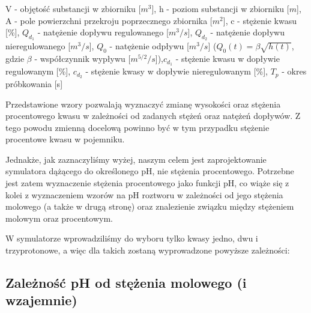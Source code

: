 \documentclass[polish,polish,a4paper,12pt]{article}
\begin{document}
	{\small V - objętość substancji w zbiorniku [$m^3$], \hspace{1em}h - poziom substancji w zbiorniku [$m$], \hspace{1em}A - pole powierzchni przekroju poprzecznego zbiornika [$m^2$], \hspace{1em}c - stężenie kwasu [\%], \hspace{1em}$Q_{d_{1}}$ - natężenie dopływu regulowanego [$m^3/s$], \hspace{1em}$Q_{d_{2}}$ - natężenie dopływu nieregulowanego [$m^3/s$], \hspace{1em} $Q_0$ - natężenie odpływu [$m^3/s$] ($Q_0(t) = \beta \sqrt{h(t)}$, gdzie $\beta$ - współczynnik wypływu [$m^{5/2}/s$]),\hspace{1em}$c_{d_{1}}$ - stężenie kwasu w dopływie regulowanym [\%], \hspace{1em}$c_{d_{2}}$ - stężenie kwasy w dopływie nieregulowanym [\%], \hspace{1em}$T_p$ - okres próbkowania [s]}
	
	Przedstawione wzory pozwalają wyznaczyć zmianę wysokości oraz stężenia procentowego kwasu w zależności od zadanych stężeń oraz natężeń dopływów. Z tego powodu zmienną docelową powinno być w tym przypadku stężenie procentowe kwasu w pojemniku.
	
	Jednakże, jak zaznaczyliśmy wyżej, naszym celem jest zaprojektowanie symulatora dążącego do określonego pH, nie stężenia procentowego. Potrzebne jest zatem wyznaczenie stężenia procentowego jako funkcji pH, co wiąże się z kolei z wyznaczeniem wzorów na pH roztworu w zależności od jego stężenia molowego (a także w drugą stronę) oraz znalezienie związku między stężeniem molowym oraz procentowym.
	
	W symulatorze wprowadziliśmy do wyboru tylko kwasy jedno, dwu i trzyprotonowe, a więc dla takich zostaną wyprowadzone powyższe zależności:
	
	\subsection{Zależność pH od stężenia molowego (i wzajemnie)}
	
\end{document}
